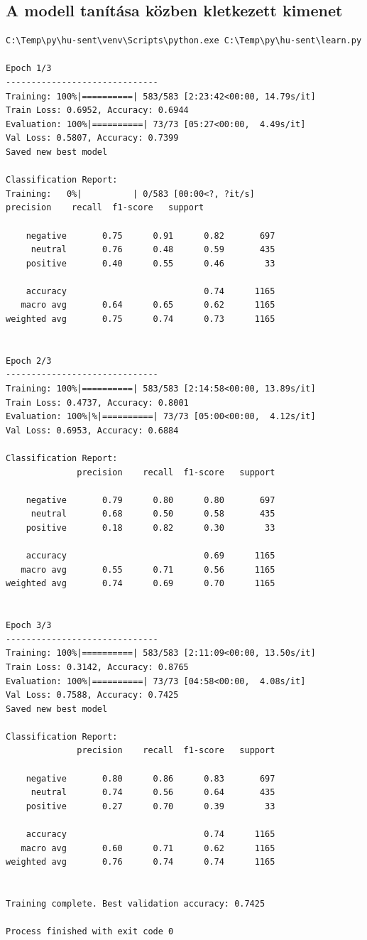 \documentclass[12pt]{article}
\begin{document}
\subsection{A modell tanítása közben kletkezett kimenet}

\begin{lstlisting}[style=docker]
C:\Temp\py\hu-sent\venv\Scripts\python.exe C:\Temp\py\hu-sent\learn.py

Epoch 1/3
------------------------------
Training: 100%|==========| 583/583 [2:23:42<00:00, 14.79s/it]
Train Loss: 0.6952, Accuracy: 0.6944
Evaluation: 100%|==========| 73/73 [05:27<00:00,  4.49s/it]
Val Loss: 0.5807, Accuracy: 0.7399
Saved new best model

Classification Report:
Training:   0%|          | 0/583 [00:00<?, ?it/s]              precision    recall  f1-score   support

    negative       0.75      0.91      0.82       697
     neutral       0.76      0.48      0.59       435
    positive       0.40      0.55      0.46        33

    accuracy                           0.74      1165
   macro avg       0.64      0.65      0.62      1165
weighted avg       0.75      0.74      0.73      1165


Epoch 2/3
------------------------------
Training: 100%|==========| 583/583 [2:14:58<00:00, 13.89s/it]
Train Loss: 0.4737, Accuracy: 0.8001
Evaluation: 100%|%|==========| 73/73 [05:00<00:00,  4.12s/it]
Val Loss: 0.6953, Accuracy: 0.6884

Classification Report:
              precision    recall  f1-score   support

    negative       0.79      0.80      0.80       697
     neutral       0.68      0.50      0.58       435
    positive       0.18      0.82      0.30        33

    accuracy                           0.69      1165
   macro avg       0.55      0.71      0.56      1165
weighted avg       0.74      0.69      0.70      1165


Epoch 3/3
------------------------------
Training: 100%|==========| 583/583 [2:11:09<00:00, 13.50s/it]
Train Loss: 0.3142, Accuracy: 0.8765
Evaluation: 100%|==========| 73/73 [04:58<00:00,  4.08s/it]
Val Loss: 0.7588, Accuracy: 0.7425
Saved new best model

Classification Report:
              precision    recall  f1-score   support

    negative       0.80      0.86      0.83       697
     neutral       0.74      0.56      0.64       435
    positive       0.27      0.70      0.39        33

    accuracy                           0.74      1165
   macro avg       0.60      0.71      0.62      1165
weighted avg       0.76      0.74      0.74      1165


Training complete. Best validation accuracy: 0.7425

Process finished with exit code 0
\end{lstlisting}
\end{document}
